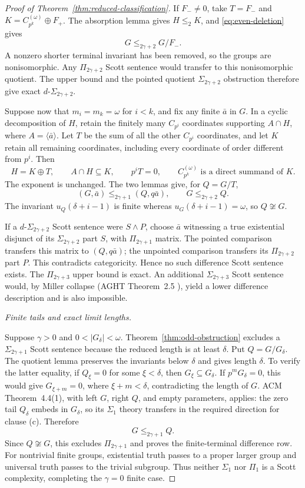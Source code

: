 \documentclass[11pt]{article}
\begin{document}
\begin{proof}[Proof of Theorem~\ref{thm:reduced-classification}]
If $F_-\ne0$, take $T=F_-$ and
$K=C_{p^k}^{(\omega)}\oplus F_+$. The absorption lemma gives
$H\le_2K$, and \eqref{eq:even-deletion} gives
\[
                            G\le_{2\gamma+2}G/F_-.
\]
A nonzero shorter terminal invariant has been removed, so the groups
are nonisomorphic. Any $\Pi_{2\gamma+2}$ Scott sentence would transfer
to this nonisomorphic quotient. The upper bound and the pointed quotient
$\Sigma_{2\gamma+2}$ obstruction therefore give exact
$d\text{-}\Sigma_{2\gamma+2}$.

Suppose now that $m_i=m_k=\omega$ for $i<k$, and fix any finite
$\bar a$ in $G$. In a cyclic decomposition of $H$, retain the finitely
many $C_{p^i}$ coordinates supporting $A\cap H$, where
$A=\langle\bar a\rangle$. Let $T$ be the sum of all the other
$C_{p^i}$ coordinates, and let $K$ retain all remaining coordinates,
including every coordinate of order different from $p^i$. Then
\[
 H=K\oplus T,\qquad A\cap H\subseteq K,\qquad
 p^iT=0,\qquad C_{p^k}^{(\omega)}\text{ is a direct summand of }K.
\]
The exponent is unchanged. The two lemmas give, for $Q=G/T$,
\[
 (G,\bar a)\le_{2\gamma+1}(Q,q\bar a),\qquad
 G\le_{2\gamma+2}Q.
\]
The invariant $u_Q(\delta+i-1)$ is finite whereas
$u_G(\delta+i-1)=\omega$, so $Q\not\cong G$.

If a $d\text{-}\Sigma_{2\gamma+2}$ Scott sentence were $S\wedge P$,
choose $\bar a$ witnessing a true existential disjunct of its
$\Sigma_{2\gamma+2}$ part $S$, with $\Pi_{2\gamma+1}$ matrix.
The pointed comparison transfers this matrix to $(Q,q\bar a)$;
the unpointed comparison transfers its $\Pi_{2\gamma+2}$ part $P$.
This contradicts categoricity. Hence no such difference Scott
sentence exists. The $\Pi_{2\gamma+3}$ upper bound is exact.
An additional $\Sigma_{2\gamma+3}$ Scott sentence would, by Miller
collapse (AGHT Theorem~2.5 \cite{AGHT}), yield a lower difference
description and is also impossible.

\medskip\noindent\emph{Finite tails and exact limit lengths.}

Suppose $\gamma>0$ and $0<|G_\delta|<\omega$. Theorem~\ref{thm:odd-obstruction}
excludes a $\Sigma_{2\gamma+1}$ Scott sentence because the reduced
length is at least $\delta$. Put $Q=G/G_\delta$. The quotient lemma
preserves the invariants below $\delta$ and gives length $\delta$.
To verify the latter equality, if $Q_\xi=0$ for some $\xi<\delta$,
then $G_\xi\subseteq G_\delta$. If $p^mG_\delta=0$, this would give
$G_{\xi+m}=0$, where $\xi+m<\delta$, contradicting the length of $G$.
ACM Theorem~4.4(1), with left $G$, right $Q$, and empty parameters,
applies: the zero tail $Q_\delta$ embeds in $G_\delta$, so its
$\Sigma_1$ theory transfers in the required direction for clause (c).
Therefore
\[
                             G\le_{2\gamma+1}Q.
\]
Since $Q\not\cong G$, this excludes $\Pi_{2\gamma+1}$ and proves the
finite-terminal difference row. For nontrivial finite groups,
existential truth passes to a proper larger group and universal truth
passes to the trivial subgroup. Thus neither $\Sigma_1$ nor $\Pi_1$
is a Scott complexity, completing the $\gamma=0$ finite case.


\end{proof}
\end{document}
